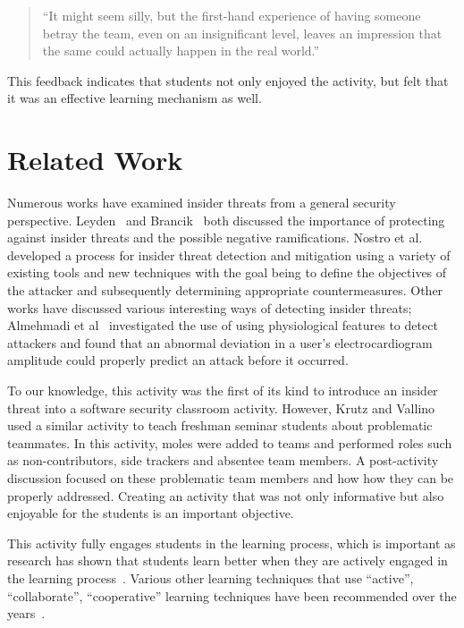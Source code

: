 \documentclass[conference]{IEEEtran}
\begin{document}
\begin{quotation}
``It might seem silly, but the first-hand experience of having someone betray the team, even on an insignificant level, leaves an impression that the same could actually happen in the real world.''
\end{quotation}

This feedback indicates that students not only enjoyed the activity, but felt that it was an effective learning mechanism as well.

\section{Related Work}
\label{sec: relatedwork}

Numerous works have examined insider threats from a general security perspective. Leyden~\cite{Leyden_URL} and Brancik~\cite{Brancik_url} both discussed the importance of protecting against insider threats and the possible negative ramifications. Nostro et al.~\cite{Nostro:2014:ITA:2694737.2694740} developed a process for insider threat detection and mitigation using a variety of existing tools and new techniques with the goal being to define the objectives of the attacker and subsequently determining appropriate countermeasures. Other works have discussed various interesting ways of detecting insider threats; Almehmadi et al~\cite{Almehmadi:2014:PIT:2659651.2659654} investigated the use of using physiological features to detect attackers and found that an abnormal deviation in a user's electrocardiogram amplitude could properly predict an attack before it occurred.

To our knowledge, this activity was the first of its kind to introduce an insider threat into a software security classroom activity. However, Krutz and Vallino~\cite{6685085} used a similar activity to teach freshman seminar students about problematic teammates. In this activity, moles were added to teams and performed roles such as non-contributors, side trackers and absentee team members. A post-activity discussion focused on these problematic team members and how how they can be properly addressed. Creating an activity that was not only informative but also enjoyable for the students is an important objective.

This activity fully engages students in the learning process, which is important as research has shown that students learn better when they are actively engaged in the learning process~\cite{19897}. Various other learning techniques that use ``active'', ``collaborate'', ``cooperative'' learning techniques have been recommended over the years~\cite{bonwell1991active, Schweitzer:2007:IVA:1227310.1227384, Bailey:2005:JTC:1047124.1047469, sutherland1996using}.
\end{document}
